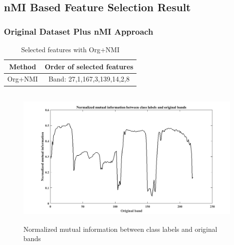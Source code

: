 \documentclass[document.tex]{subfiles}
\begin{document}
\subsection{nMI Based Feature Selection Result}
\subsubsection{Original Dataset Plus nMI Approach}
\begin{table}[H]
	\caption{Selected features with Org+NMI}
	\begin{center}
		\begin{tabular}{|c|c|}
			\hline
			Method & Order of selected features\\ \hline
			Org+NMI & Band: 27,1,167,3,139,14,2,8\\ \hline
		\end{tabular}
	\end{center}
	\label{tab:Selected features with Org+NMI}
\end{table}
\begin{figure}[H]
	\begin{center}
		\includegraphics[height=7.0cm]{imgs/OrgNmi.png}
	\end{center}
	\caption{Normalized mutual information between class labels and original bands}
	\label{fig:Normalized mutual information between class labels and original bands}
\end{figure}
\end{document}
